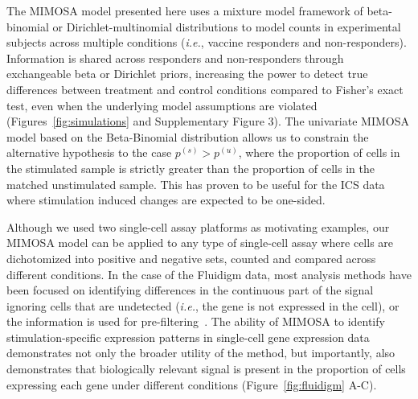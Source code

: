 \documentclass[12pt,oupdraft]{biostatistics}
\begin{document}
The MIMOSA model presented here uses a mixture model framework of beta-binomial or Dirichlet-multinomial distributions to model counts in experimental subjects across multiple conditions (\textit{i.e.}, vaccine responders and non-responders). Information is shared across responders and non-responders through exchangeable beta or Dirichlet priors, increasing the power to detect true differences between treatment and control conditions compared to Fisher's exact test, even when the underlying model assumptions are violated (Figures~\ref{fig:simulations} and Supplementary Figure 3). The univariate MIMOSA model based on the Beta-Binomial distribution allows us to constrain the alternative hypothesis to the case $p^{(s)} > p^{(u)}$, where the proportion of cells in the stimulated sample is strictly greater than the proportion of cells in the matched unstimulated sample. This has proven to be useful for the ICS data where stimulation induced changes are expected to be one-sided.

Although we used two single-cell assay platforms as motivating examples, our MIMOSA model can be applied to any type of single-cell assay where cells are dichotomized into positive and negative sets, counted and compared across different conditions.
In the case of the Fluidigm data, most analysis methods have been focused on identifying differences in the continuous part of the signal ignoring cells that are undetected (\textit{i.e.}, the gene is not expressed in the cell), or the information is used for pre-filtering~\citep{Flatz:2011jb}.
The ability of MIMOSA to identify stimulation-specific expression patterns in single-cell gene expression data demonstrates not only the broader utility of the method, but importantly, also demonstrates that biologically relevant signal is present in the proportion of cells expressing each gene under different conditions (Figure~\ref{fig:fluidigm} A-C).
\end{document}
